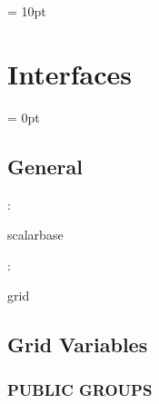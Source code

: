 \vspace{0.5cm}\parskip = 10pt 

\section{Interfaces} 


\parskip = 0pt

\vspace{3mm} \subsection*{General}

: 

scalarbase
\vspace{2mm}

: 

grid
\vspace{2mm}
\subsection*{Grid Variables}
\vspace{5mm}\subsubsection{PUBLIC GROUPS}

\vspace{5mm}

